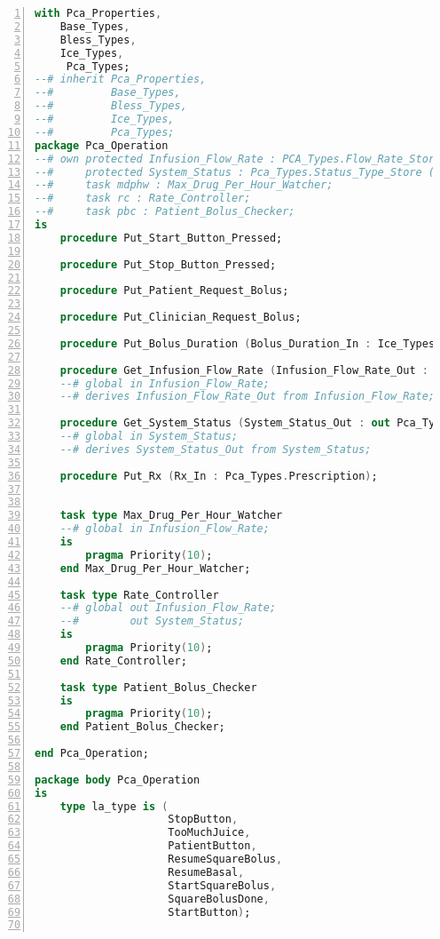 \newpage

\singlespacing
\begin{lstlisting}[language=ada, gobble=0, numbers=left, caption={\lstinline{Pca_Operation} package}, label={listing:pca_generated:pca_operation}]
with Pca_Properties,
    Base_Types,
    Bless_Types,
    Ice_Types,
     Pca_Types;
--# inherit Pca_Properties,
--#         Base_Types,
--#         Bless_Types,
--#         Ice_Types,
--#         Pca_Types;
package Pca_Operation
--# own protected Infusion_Flow_Rate : PCA_Types.Flow_Rate_Store (Priority=>10);
--#     protected System_Status : Pca_Types.Status_Type_Store (Priority=>10);
--#     task mdphw : Max_Drug_Per_Hour_Watcher;
--#     task rc : Rate_Controller;
--#     task pbc : Patient_Bolus_Checker;
is
    procedure Put_Start_Button_Pressed;

    procedure Put_Stop_Button_Pressed;

    procedure Put_Patient_Request_Bolus;

    procedure Put_Clinician_Request_Bolus;

    procedure Put_Bolus_Duration (Bolus_Duration_In : Ice_Types.Minute);

    procedure Get_Infusion_Flow_Rate (Infusion_Flow_Rate_Out : out Pca_Types.Flow_Rate);
    --# global in Infusion_Flow_Rate;
    --# derives Infusion_Flow_Rate_Out from Infusion_Flow_Rate;

    procedure Get_System_Status (System_Status_Out : out Pca_Types.Status_Type);
    --# global in System_Status;
    --# derives System_Status_Out from System_Status;

    procedure Put_Rx (Rx_In : Pca_Types.Prescription);


    task type Max_Drug_Per_Hour_Watcher
    --# global in Infusion_Flow_Rate;
    is
        pragma Priority(10);
    end Max_Drug_Per_Hour_Watcher;

    task type Rate_Controller
    --# global out Infusion_Flow_Rate;
    --#        out System_Status;
    is
        pragma Priority(10);
    end Rate_Controller;

    task type Patient_Bolus_Checker
    is
        pragma Priority(10);
    end Patient_Bolus_Checker;

end Pca_Operation;

package body Pca_Operation
is
    type la_type is (
                     StopButton,
                     TooMuchJuice,
                     PatientButton,
                     ResumeSquareBolus,
                     ResumeBasal,
                     StartSquareBolus,
                     SquareBolusDone,
                     StartButton);


\end{lstlisting}

